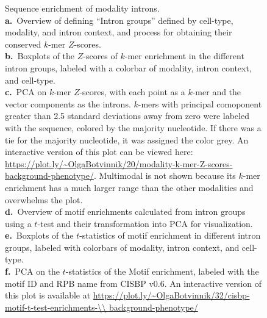 \clearpage
\thispagestyle{facingcaption}
\begin{figure}[h]
\captionsetup{labelformat=prev-page}
\caption[Sequence enrichment of modality introns.]{
Sequence enrichment of modality introns.\\
\textbf{a.}~Overview of defining ``Intron groups'' defined by cell-type, modality, and intron context, and process for obtaining their conserved $k$-mer $Z$-scores.\\
\textbf{b.}~Boxplots of the $Z$-scores of $k$-mer enrichment in the different intron groups, labeled with a colorbar of modality, intron context, and cell-type.\\
\textbf{c.}~PCA on $k$-mer $Z$-scores, with each point as a $k$-mer and the vector components as the introns. $k$-mers with principal comoponent greater than 2.5 standard deviations away from zero were labeled with the sequence, colored by the majority nucleotide. If there was a tie for the majority nucleotide, it was assigned the color grey. An interactive version of this plot can be viewed here: \url{https://plot.ly/~OlgaBotvinnik/20/modality-k-mer-Z-scores-background-phenotype/}. Multimodal is not shown because its $k$-mer enrichment has a much larger range than the other modalities and overwhelms the plot.\\
\textbf{d.}~Overview of motif enrichments calculated from intron groups using a $t$-test and their transformation into PCA for visualization.\\
\textbf{e.}~Boxplots of the $t$-statistics of motif enrichment in different intron groups, labeled with colorbars of modality, intron context, and cell-type.\\
\textbf{f.}~PCA on the $t$-statistics of the Motif enrichment, labeled with the motif ID and RPB name from CISBP v0.6. An interactive version of this plot is available at\linebreak
\url{https://plot.ly/~OlgaBotvinnik/32/cisbp-motif-t-test-enrichments-\\ background-phenotype/}
}
\label{fig:modality_features_supplementary_part2}

\end{figure}
\clearpage
